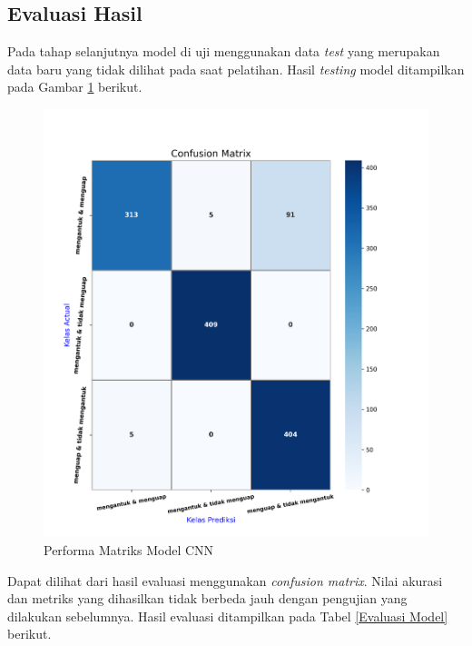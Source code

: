  \subsection{Evaluasi Hasil}

        Pada tahap selanjutnya model di uji menggunakan data \textit{test} yang merupakan data baru yang tidak dilihat pada saat pelatihan. Hasil \textit{testing} model ditampilkan pada Gambar \ref{akurasi model terbaik} berikut.

          \begin{figure}[H]
              \centering
              \includegraphics[width=0.75\linewidth]{figures/bab4/confusion matriks.png}
              \caption{Performa Matriks Model CNN}
              \label{akurasi model terbaik}
          \end{figure}

        Dapat dilihat dari hasil evaluasi menggunakan \textit{confusion matrix}. Nilai akurasi dan metriks yang dihasilkan tidak berbeda jauh dengan pengujian yang dilakukan sebelumnya. Hasil evaluasi ditampilkan pada Tabel \ref{Evaluasi Model} berikut.


